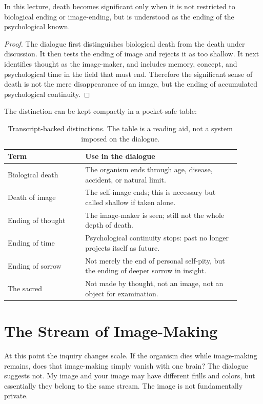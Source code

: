 \begin{proposition}
In this lecture, death becomes significant only when it is not restricted to biological ending or image-ending, but is understood as the ending of the psychological known.
\end{proposition}

\begin{proof}
The dialogue first distinguishes biological death from the death under discussion. It then tests the ending of image and rejects it as too shallow. It next identifies thought as the image-maker, and includes memory, concept, and psychological time in the field that must end. Therefore the significant sense of death is not the mere disappearance of an image, but the ending of accumulated psychological continuity.
\end{proof}

The distinction can be kept compactly in a pocket-safe table:
\begin{table}
\centering
\begin{tabular}{p{0.30\linewidth}p{0.60\linewidth}}
\hline
\textbf{Term} & \textbf{Use in the dialogue} \\
\hline
Biological death & The organism ends through age, disease, accident, or natural limit. \\
Death of image & The self-image ends; this is necessary but called shallow if taken alone. \\
Ending of thought & The image-maker is seen; still not the whole depth of death. \\
Ending of time & Psychological continuity stops: past no longer projects itself as future. \\
Ending of sorrow & Not merely the end of personal self-pity, but the ending of deeper sorrow in insight. \\
The sacred & Not made by thought, not an image, not an object for examination. \\
\hline
\end{tabular}
\caption{Transcript-backed distinctions. The table is a reading aid, not a system imposed on the dialogue.}
\end{table}

\section{The Stream of Image-Making}

At this point the inquiry changes scale. If the organism dies while image-making remains, does that image-making simply vanish with one brain? The dialogue suggests not. My image and your image may have different frills and colors, but essentially they belong to the same stream. The image is not fundamentally private.

